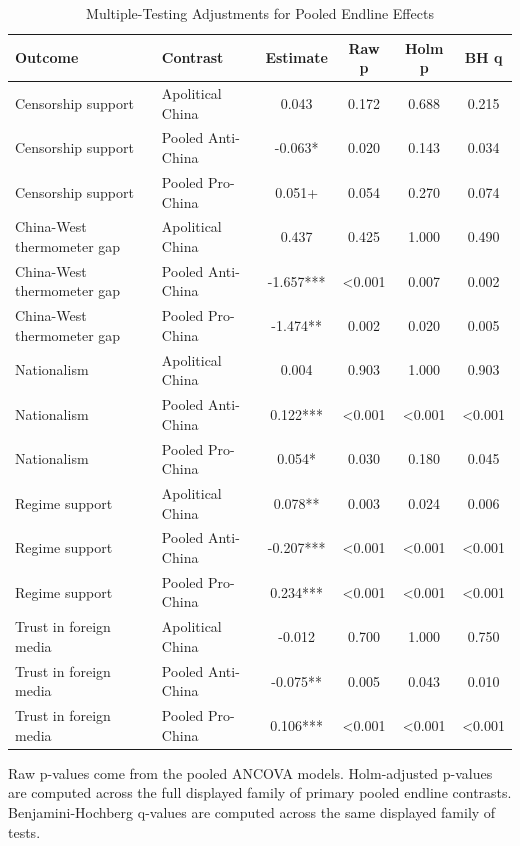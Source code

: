 \begin{table}[H]
\centering
\caption{Multiple-Testing Adjustments for Pooled Endline Effects}
\label{tab:multiple_testing_t1}
\footnotesize
\begin{threeparttable}
\begin{tabular}{llcccc}
\toprule
Outcome & Contrast & Estimate & Raw p & Holm p & BH q \\
\midrule
Censorship support & Apolitical China & 0.043 & 0.172 & 0.688 & 0.215 \\
Censorship support & Pooled Anti-China & -0.063* & 0.020 & 0.143 & 0.034 \\
Censorship support & Pooled Pro-China & 0.051+ & 0.054 & 0.270 & 0.074 \\
China-West thermometer gap & Apolitical China & 0.437 & 0.425 & 1.000 & 0.490 \\
China-West thermometer gap & Pooled Anti-China & -1.657*** & <0.001 & 0.007 & 0.002 \\
China-West thermometer gap & Pooled Pro-China & -1.474** & 0.002 & 0.020 & 0.005 \\
Nationalism & Apolitical China & 0.004 & 0.903 & 1.000 & 0.903 \\
Nationalism & Pooled Anti-China & 0.122*** & <0.001 & <0.001 & <0.001 \\
Nationalism & Pooled Pro-China & 0.054* & 0.030 & 0.180 & 0.045 \\
Regime support & Apolitical China & 0.078** & 0.003 & 0.024 & 0.006 \\
Regime support & Pooled Anti-China & -0.207*** & <0.001 & <0.001 & <0.001 \\
Regime support & Pooled Pro-China & 0.234*** & <0.001 & <0.001 & <0.001 \\
Trust in foreign media & Apolitical China & -0.012 & 0.700 & 1.000 & 0.750 \\
Trust in foreign media & Pooled Anti-China & -0.075** & 0.005 & 0.043 & 0.010 \\
Trust in foreign media & Pooled Pro-China & 0.106*** & <0.001 & <0.001 & <0.001 \\
\bottomrule
\end{tabular}
\begin{tablenotes}[flushleft]
\footnotesize
\item Raw p-values come from the pooled ANCOVA models. Holm-adjusted p-values are computed across the full displayed family of primary pooled endline contrasts. Benjamini-Hochberg q-values are computed across the same displayed family of tests.
\end{tablenotes}
\end{threeparttable}
\end{table}
